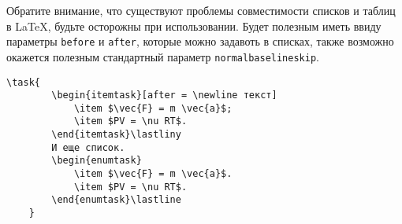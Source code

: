 \noindent
{}

\vspace{0.3cm}

Обратите внимание, что существуют проблемы совместимости списков и таблиц в \LaTeX, будьте осторожны при
использовании. Будет полезным иметь ввиду параметры \texttt{before} и \texttt{after}, которые можно
задавоть в списках, также возможно окажется полезным стандартный параметр \texttt{normalbaselineskip}.

\begin{lstlisting}[gobble = 3]
    \task{
        \begin{itemtask}[after = \newline текст]
            \item $\vec{F} = m \vec{a}$;
            \item $PV = \nu RT$.
        \end{itemtask}\lastlinу
        И еще список.
        \begin{enumtask}
            \item $\vec{F} = m \vec{a}$.
            \item $PV = \nu RT$.
        \end{enumtask}\lastline
    }
\end{lstlisting}

\noindent
{}

